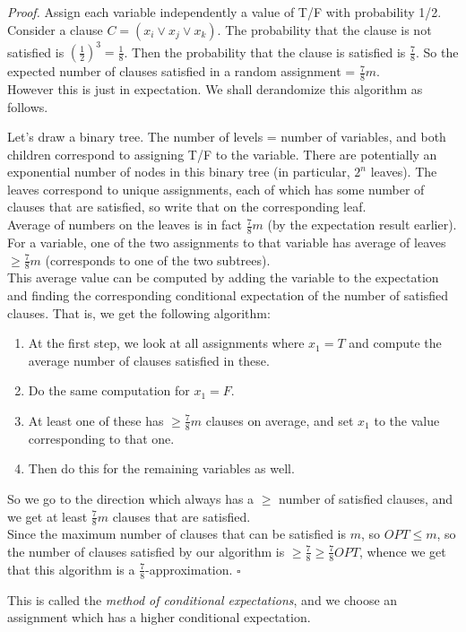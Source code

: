 \documentclass[a4paper]{article}
\newenvironment{proof}{\begin{breakbox}\textit{Proof.}}{\hfill$\square$\end{breakbox}}
\newcommand{\nl}{\vspace{0.2cm}\\}
\begin{document}
\begin{proof}
    Assign each variable independently a value of T/F with probability 1/2.
    Consider a clause $C = (x_i \lor x_j \lor x_k)$. The probability that the clause is not satisfied is $\left(\frac{1}{2}\right)^3 = \frac{1}{8}$. Then the probability that the clause is satisfied
    is $\frac{7}{8}$. So the expected number of clauses satisfied in a random assignment = $\frac{7}{8}m$.\nl
    However this is just in expectation. We shall derandomize this algorithm as follows.

    Let's draw a binary tree. The number of levels = number of variables, and both children correspond to assigning T/F to the variable. There are potentially an exponential number of
    nodes in this binary tree (in particular, $2^n$ leaves). The leaves correspond to unique assignments, each of which has some number of clauses that are satisfied, so write that on the
    corresponding leaf.\nl
    Average of numbers on the leaves is in fact $\frac{7}{8}m$ (by the expectation result earlier). For a variable, one of the two assignments to that variable has average of leaves $\ge \frac{7}{8}m$
    (corresponds to one of the two subtrees).\nl
    This average value can be computed by adding the variable to the expectation and finding the corresponding conditional expectation of the number of satisfied clauses. That is, we get the following algorithm:
    \begin{enumerate}
        \item At the first step, we look at all assignments where $x_1 = T$ and compute the average number of clauses satisfied in these.
        \item Do the same computation for $x_1 = F$.
        \item At least one of
            these has $\ge \frac{7}{8}m$ clauses on average, and set $x_1$ to the value corresponding to that one.
        \item Then do this for the remaining variables as well.
    \end{enumerate}
    So we go to the direction which always has a $\ge$ number of satisfied clauses, and we get at least $\frac{7}{8}m$ clauses that are satisfied.\nl
    Since the maximum number of clauses that can be satisfied is $m$, so $OPT \le m$, so the number of clauses satisfied by our algorithm is $\ge \frac{7}{8} \ge \frac{7}{8}OPT$, whence
    we get that this algorithm is a $\frac{7}{8}$-approximation.
\end{proof}

\begin{note}
    This is called the \emph{method of conditional expectations}, and we choose an assignment which has a higher conditional expectation.
\end{note}
\end{document}

